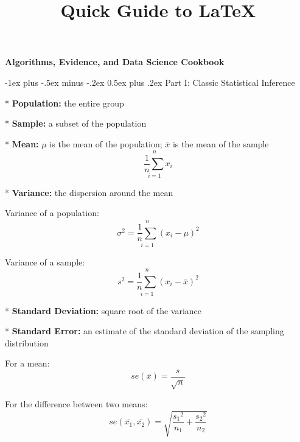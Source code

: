 \documentclass[10pt,landscape]{article}
\title{Quick Guide to LaTeX}
\makeatletter
\renewcommand{\section}{\@startsection{section}{1}{0mm}%
                                {-1ex plus -.5ex minus -.2ex}%
                                {0.5ex plus .2ex}%
                                {\normalfont\large\bfseries}}
\makeatother
\begin{document}
\raggedright
\footnotesize

\begin{center}
     \Large{\textbf{Algorithms, Evidence, and Data Science Cookbook}} \\
\end{center}
\begin{multicols}{3}
\setlength{\premulticols}{1pt}
\setlength{\postmulticols}{1pt}
\setlength{\multicolsep}{1pt}
\setlength{\columnsep}{2pt}

\section{Part I: Classic Statistical Inference} %

* \textbf{Population:} the entire group

* \textbf{Sample:} a subset of the population

* \textbf{Mean:} 
$\mu$ is the mean of the population; $\bar{x}$ is the mean of the sample
$$ \underset{i=1}{\overset{n}{\frac{1}{n}\sum }}x_i $$

* \textbf{Variance:} the dispersion around the mean
\begin{multicols}{2}
Variance of a population:
$$ \sigma^2 = \underset{i=1}{\overset{n}{\frac{1}{n}\sum }} {\left(x_i - \mu \right)}^2 $$

\pagebreak 
Variance of a sample:
$$ s^2 = \underset{i=1}{\overset{n}{\frac{1}{n}\sum }} {\left(x_i - \bar{x} \right)}^2 $$
\end{multicols}

* \textbf{Standard Deviation:} square root of the variance

* \textbf{Standard Error:} an estimate of the standard deviation of the sampling distribution
\begin{multicols}{2}
For a mean:
$$ se(\bar{x}) = \frac{s}{\sqrt{n}} $$

\pagebreak 
For the difference between two means:
$$ se(\bar{x_1}, \bar{x_2}) = \sqrt{\frac{{s_1}^2}{n_1} + \frac{{s_2}^2}{n_2}} $$
\end{multicols}


\end{multicols}
\end{document}

